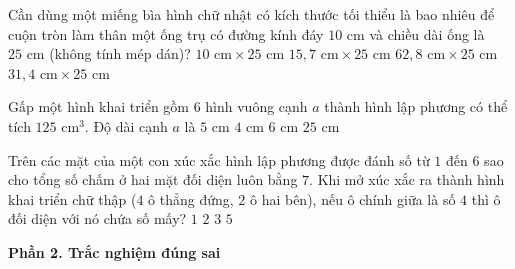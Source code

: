 \begin{ex} %
Cần dùng một miếng bìa hình chữ nhật có kích thước tối thiểu là bao nhiêu để cuộn tròn làm thân một ống trụ có đường kính đáy $10\text{ cm}$ và chiều dài ống là $25\text{ cm}$ (không tính mép dán)?
\choice
{$10\text{ cm} \times 25\text{ cm}$}
{$15{,}7\text{ cm} \times 25\text{ cm}$}
{$62{,}8\text{ cm} \times 25\text{ cm}$}
{\True $31{,}4\text{ cm} \times 25\text{ cm}$}
\end{ex}

\begin{ex} %
Gấp một hình khai triển gồm $6$ hình vuông cạnh $a$ thành hình lập phương có thể tích $125\text{ cm}^3$. Độ dài cạnh $a$ là
\choice
{\True $5\text{ cm}$}
{$4\text{ cm}$}
{$6\text{ cm}$}
{$25\text{ cm}$}
\end{ex}

\begin{ex} %
Trên các mặt của một con xúc xắc hình lập phương được đánh số từ $1$ đến $6$ sao cho tổng số chấm ở hai mặt đối diện luôn bằng $7$. Khi mở xúc xắc ra thành hình khai triển chữ thập ($4$ ô thẳng đứng, $2$ ô hai bên), nếu ô chính giữa là số $4$ thì ô đối diện với nó chứa số mấy?
\choice
{$1$}
{$2$}
{\True $3$}
{$5$}
\end{ex}

\textbf{Phần 2. Trắc nghiệm đúng sai}

